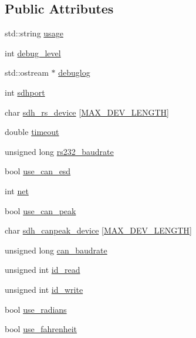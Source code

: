 \subsection*{\-Public \-Attributes}
\begin{DoxyCompactItemize}
\item 
std\-::string \hyperlink{classcSDHOptions_a85c5365609e4b34511b81d4c06e6c65c}{usage}
\item 
int \hyperlink{classcSDHOptions_a3cf6556a2758bf431b4e93e5c2adefb7}{debug\-\_\-level}
\item 
std\-::ostream $\ast$ \hyperlink{classcSDHOptions_a71ac0c016aeb7cc34c521d06fa905198}{debuglog}
\item 
int \hyperlink{classcSDHOptions_a565bf00d92a0aca8729c3bd1e0f92be2}{sdhport}
\item 
char \hyperlink{classcSDHOptions_aa33357676ec18be7dbd162e7dac93406}{sdh\-\_\-rs\-\_\-device} \mbox{[}\hyperlink{classcSDHOptions_a9caeb9858b718ed48145a833be2c9178}{\-M\-A\-X\-\_\-\-D\-E\-V\-\_\-\-L\-E\-N\-G\-T\-H}\mbox{]}
\item 
double \hyperlink{classcSDHOptions_a68c00cb00f9ee6a70974ce9c27e4f3d1}{timeout}
\item 
unsigned long \hyperlink{classcSDHOptions_a38c8ae82f4fa578b04d1a9b9fffbe063}{rs232\-\_\-baudrate}
\item 
bool \hyperlink{classcSDHOptions_afa459c797bb8fbb2ad6f45a39261e3d8}{use\-\_\-can\-\_\-esd}
\item 
int \hyperlink{classcSDHOptions_adefa363d3e2c61e37676037a09faaf06}{net}
\item 
bool \hyperlink{classcSDHOptions_ab0b03472ff934016086feaed1cf8d5ea}{use\-\_\-can\-\_\-peak}
\item 
char \hyperlink{classcSDHOptions_acd04aeab5f6ab8e962b739de10bf4d08}{sdh\-\_\-canpeak\-\_\-device} \mbox{[}\hyperlink{classcSDHOptions_a9caeb9858b718ed48145a833be2c9178}{\-M\-A\-X\-\_\-\-D\-E\-V\-\_\-\-L\-E\-N\-G\-T\-H}\mbox{]}
\item 
unsigned long \hyperlink{classcSDHOptions_a2376bfefe00e6f9832c16a979b99bf92}{can\-\_\-baudrate}
\item 
unsigned int \hyperlink{classcSDHOptions_a301e3d6b905c010e82a45420f5cd5634}{id\-\_\-read}
\item 
unsigned int \hyperlink{classcSDHOptions_a3ca7757c9dbb11c190987992582132ab}{id\-\_\-write}
\item 
bool \hyperlink{classcSDHOptions_a484031d2facdcdf2fc3ec9b26df45819}{use\-\_\-radians}
\item 
bool \hyperlink{classcSDHOptions_a6724ffca7223e593e24d74c90a238dab}{use\-\_\-fahrenheit}

\end{DoxyCompactItemize}
